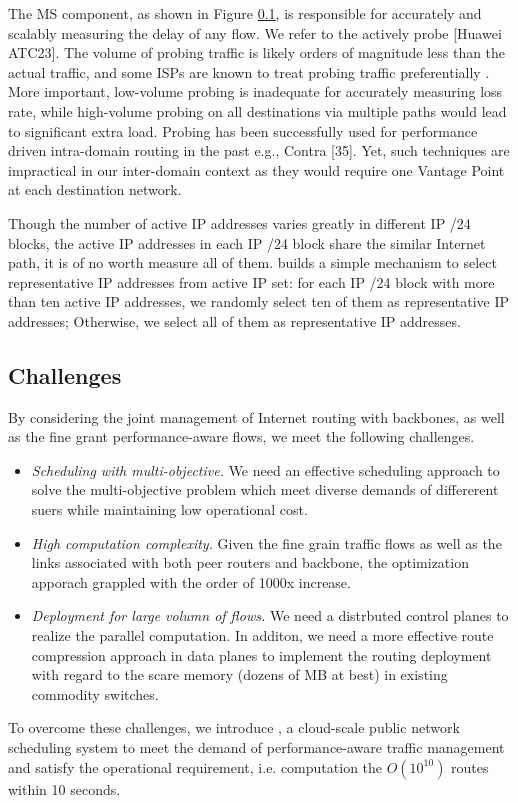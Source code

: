 The MS component, as shown in Figure \ref{}, is responsible for accurately and scalably measuring the delay of any flow. We refer to the actively probe [Huawei ATC23]. The volume of probing traffic is likely orders of magnitude less than the actual traffic, and some ISPs are known to treat probing traffic preferentially \cite{zhang2010optimizingEntact, valancius2013PECAN, liu2016Footprint}. More important, low-volume probing is inadequate for accurately measuring loss rate, while high-volume probing on all destinations via multiple paths would lead to significant extra load. Probing has been successfully used for performance driven intra-domain routing in the past e.g., Contra [35]. Yet, such techniques are impractical in our inter-domain context as they would require one Vantage Point at each destination network. 

Though the number of active IP addresses varies greatly in different IP /24 blocks, the active IP addresses in each IP /24 block share the similar Internet path, it is of no worth measure all of them. {\sys} builds a simple mechanism to select representative IP addresses from active IP set: for each IP /24 block with more than ten active IP addresses, we randomly select ten of them as representative IP addresses; Otherwise, we select all of them as representative IP addresses. 

\subsection{Challenges}
By considering the joint management of Internet routing with backbones, as well as the fine grant performance-aware flows, we meet the following challenges. 

\begin{itemize}[leftmargin=*] 
\item \textit{Scheduling with multi-objective.} We need an effective scheduling approach to solve the multi-objective problem which meet diverse demands of differerent suers while maintaining low operational cost.  
\item \textit{High computation complexity.} Given the fine grain traffic flows as well as the links associated with both peer routers and backbone, the optimization apporach grappled with the order of 1000x increase. 
\item \textit{Deployment for large volumn of flows.} We need a distrbuted control planes to realize the parallel computation. In additon, we need a more effective route compression approach in data planes to implement the routing deployment with regard to the scare memory (dozens of MB at best) in existing commodity switches.
\end{itemize}

To overcome these challenges, we introduce {\sys}, a cloud-scale public network scheduling system to meet the demand of performance-aware traffic management and satisfy the operational requirement, i.e. computation the $O(10^{10})$ routes within 10 seconds.

